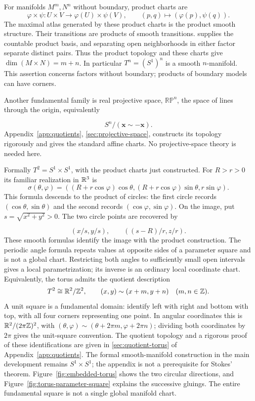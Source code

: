 
\FloatBarrier
\begin{example}
For manifolds $M^m,N^n$ without boundary, product charts are
\[
\varphi\times\psi:U\times V\to\varphi(U)\times\psi(V),\qquad
(p,q)\mapsto(\varphi(p),\psi(q)).
\]
The maximal atlas generated by these product charts is the product smooth
structure. Their transitions are products of smooth transitions.
 supplies the
countable product basis, and separating open neighborhoods in either factor
separate distinct pairs. Thus the product topology and these charts give
$\dim(M\times N)=m+n$. In particular $T^n=(S^1)^n$ is a smooth
$n$-manifold. This assertion concerns factors without boundary; products
of boundary models can have corners.
\end{example}

Another fundamental family is real projective space,
$\mathbb{RP}^n$, the space of lines through the origin, equivalently

\[
S^n/(\mathbf{x}\sim-\mathbf{x}).
\]
 Appendix~\ref{app:quotients},
\cref{sec:projective-space}, constructs its topology rigorously and gives
the standard affine charts. No projective-space theory is needed here.

\begin{example}
Formally $T^2=S^1\times S^1$, with the product charts just constructed.
For $R>r>0$ its familiar realization in $\mathbb{R}^3$ is
\[
\sigma(\theta,\varphi)=((R+r\cos\varphi)\cos\theta,
(R+r\cos\varphi)\sin\theta,r\sin\varphi).
\]
This formula descends to the product of circles: the first circle
records $(\cos\theta,\sin\theta)$ and the second records
$(\cos\varphi,\sin\varphi)$. On the image, put $s=\sqrt{x^2+y^2}>0$.
The two circle points are recovered by

\[
(x/s,y/s),\qquad ((s-R)/r,z/r).
\]
 These smooth formulas identify the
image with the product construction. The periodic angle formula repeats
values at opposite sides of a parameter square and is not a global chart.
Restricting both angles to sufficiently small open intervals gives a
local parametrization; its inverse is an ordinary local coordinate chart.
Equivalently, the torus admits the quotient description
\[
T^2\cong\mathbb{R}^2/\mathbb{Z}^2,\qquad
(x,y)\sim(x+m,y+n)\quad(m,n\in\mathbb{Z}).
\]
A unit square is a fundamental domain: identify left with right and bottom
with top, with all four corners representing one point. In angular
coordinates this is $\mathbb{R}^2/(2\pi\mathbb{Z})^2$, with
$(\theta,\varphi)\sim(\theta+2\pi m,\varphi+2\pi n)$;
dividing both coordinates by $2\pi$ gives the unit-square convention.
The quotient topology and a rigorous proof of these identifications are
given in \cref{sec:quotient-torus} of Appendix~\ref{app:quotients}.
The formal smooth-manifold construction in the main development remains
$S^1\times S^1$; the appendix is not a prerequisite for Stokes' theorem.
Figure~\ref{fig:embedded-torus} shows the two circular directions, and
Figure~\ref{fig:torus-parameter-square} explains the successive gluings.
The entire fundamental square is not a single global manifold chart.
\end{example}


\FloatBarrier
